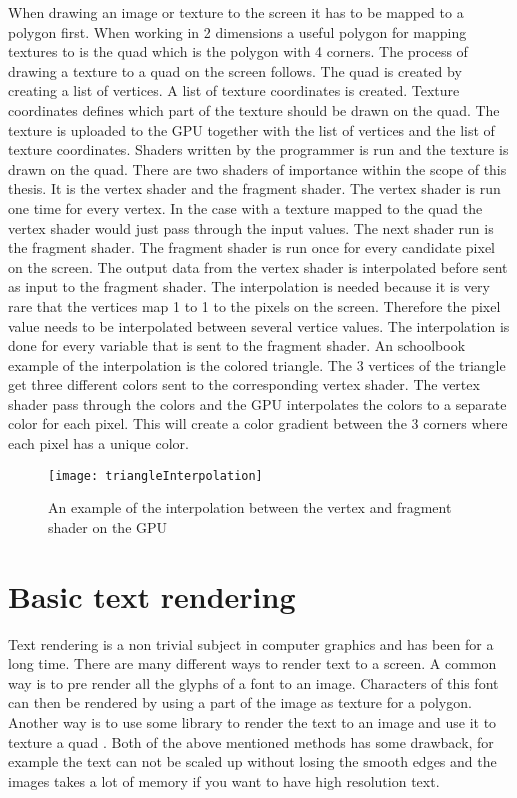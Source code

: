 When drawing an image or texture to the screen it has to be mapped to a polygon first. When working in 2 dimensions a useful polygon for mapping textures to is the quad which is the polygon with 4 corners. The process of drawing a texture to a quad on the screen follows. The quad is created by creating a list of vertices. A list of texture coordinates is created. Texture coordinates defines which part of the texture should be drawn on the quad. The texture is uploaded to the GPU together with the list of vertices and the list of texture coordinates. Shaders written by the programmer is run and the texture is drawn on the quad. There are two shaders of importance within the scope of this thesis. It is the vertex shader and the fragment shader. The vertex shader is run one time for every vertex. In the case with a texture mapped to the quad the vertex shader would just pass through the input values. The next shader run is the fragment shader. The fragment shader is run once for every candidate pixel on the screen. The output data from the vertex shader is interpolated before sent as input to the fragment shader. The interpolation is needed because it is very rare that the vertices map 1 to 1 to the pixels on the screen. Therefore the pixel value needs to be interpolated between several vertice values. The interpolation is done for every variable that is sent to the fragment shader. An schoolbook example of the interpolation is the colored triangle. The 3 vertices of the triangle get three different colors sent to the corresponding vertex shader. The vertex shader pass through the colors and the GPU interpolates the colors to a separate color for each pixel. This will create a color gradient between the 3 corners where each pixel has a unique color. 
\begin{figure}[H]
\centerline{\texttt{[image: triangleInterpolation]}}
\caption{An example of the interpolation between the vertex and fragment shader on the GPU}
\end{figure}
\section{Basic text rendering}\label{textrendering}
Text rendering is a non trivial subject in computer graphics and has been for a long time. There are many different ways to render text to a screen. A common way is to pre render all the glyphs of a font to an image. Characters of this font can then be rendered by using a part of the image as texture for a polygon. Another way is to use some library to render the text to an image and use it to texture a quad \citep{FreeType}. Both of the above mentioned methods has some drawback, for example the text can not be scaled up without losing the smooth edges and the images takes a lot of memory if you want to have high resolution text.

